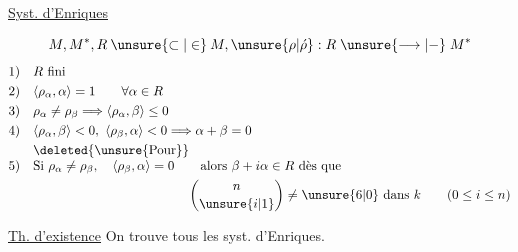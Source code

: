 \uline{Syst. d'Enriques}

\[
M,M^*,R\mathbin{\unsure{\subset|\in}}M,\unsure{\rho|\acute{\rho}}:R\mathrel{\unsure{\longrightarrow|-}}M^*
\]
\[
\begin{aligned}
1)\quad &R\ \text{fini}\\
2)\quad &\langle\rho_\alpha,\alpha\rangle=1\qquad\forall\alpha\in R\\
3)\quad &\rho_\alpha\neq\rho_\beta\Longrightarrow\langle\rho_\alpha,\beta\rangle\leq0\\
4)\quad &\langle\rho_\alpha,\beta\rangle<0,\ \langle\rho_\beta,\alpha\rangle<0
 \Longrightarrow\alpha+\beta=0\\
&\text{\deleted{\unsure{Pour}}}\\[-3pt]
5)\quad &\text{Si }\rho_\alpha\neq\rho_\beta,\quad\langle\rho_\beta,\alpha\rangle=0\qquad
 \text{alors }\beta+i\alpha\in R\ \text{dès que}\\
&\hspace{12em}\binom{n}{\unsure{i|1}}\neq\unsure{6|0}\ \text{dans }k\qquad(0\leq i\leq n)
\end{aligned}
\]

\uline{Th. d'existence} On trouve tous les syst. d'Enriques.

